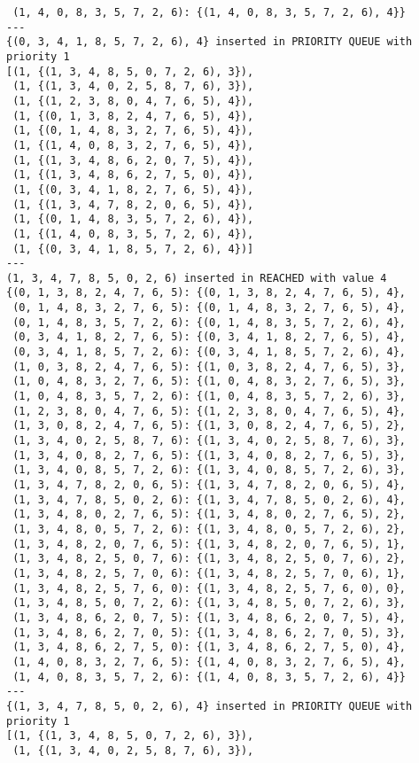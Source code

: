 \documentclass{article}
\begin{document}
\begin{verbatim}
 (1, 4, 0, 8, 3, 5, 7, 2, 6): {(1, 4, 0, 8, 3, 5, 7, 2, 6), 4}}
---
{(0, 3, 4, 1, 8, 5, 7, 2, 6), 4} inserted in PRIORITY QUEUE with priority 1
[(1, {(1, 3, 4, 8, 5, 0, 7, 2, 6), 3}),
 (1, {(1, 3, 4, 0, 2, 5, 8, 7, 6), 3}),
 (1, {(1, 2, 3, 8, 0, 4, 7, 6, 5), 4}),
 (1, {(0, 1, 3, 8, 2, 4, 7, 6, 5), 4}),
 (1, {(0, 1, 4, 8, 3, 2, 7, 6, 5), 4}),
 (1, {(1, 4, 0, 8, 3, 2, 7, 6, 5), 4}),
 (1, {(1, 3, 4, 8, 6, 2, 0, 7, 5), 4}),
 (1, {(1, 3, 4, 8, 6, 2, 7, 5, 0), 4}),
 (1, {(0, 3, 4, 1, 8, 2, 7, 6, 5), 4}),
 (1, {(1, 3, 4, 7, 8, 2, 0, 6, 5), 4}),
 (1, {(0, 1, 4, 8, 3, 5, 7, 2, 6), 4}),
 (1, {(1, 4, 0, 8, 3, 5, 7, 2, 6), 4}),
 (1, {(0, 3, 4, 1, 8, 5, 7, 2, 6), 4})]
---
(1, 3, 4, 7, 8, 5, 0, 2, 6) inserted in REACHED with value 4
{(0, 1, 3, 8, 2, 4, 7, 6, 5): {(0, 1, 3, 8, 2, 4, 7, 6, 5), 4},
 (0, 1, 4, 8, 3, 2, 7, 6, 5): {(0, 1, 4, 8, 3, 2, 7, 6, 5), 4},
 (0, 1, 4, 8, 3, 5, 7, 2, 6): {(0, 1, 4, 8, 3, 5, 7, 2, 6), 4},
 (0, 3, 4, 1, 8, 2, 7, 6, 5): {(0, 3, 4, 1, 8, 2, 7, 6, 5), 4},
 (0, 3, 4, 1, 8, 5, 7, 2, 6): {(0, 3, 4, 1, 8, 5, 7, 2, 6), 4},
 (1, 0, 3, 8, 2, 4, 7, 6, 5): {(1, 0, 3, 8, 2, 4, 7, 6, 5), 3},
 (1, 0, 4, 8, 3, 2, 7, 6, 5): {(1, 0, 4, 8, 3, 2, 7, 6, 5), 3},
 (1, 0, 4, 8, 3, 5, 7, 2, 6): {(1, 0, 4, 8, 3, 5, 7, 2, 6), 3},
 (1, 2, 3, 8, 0, 4, 7, 6, 5): {(1, 2, 3, 8, 0, 4, 7, 6, 5), 4},
 (1, 3, 0, 8, 2, 4, 7, 6, 5): {(1, 3, 0, 8, 2, 4, 7, 6, 5), 2},
 (1, 3, 4, 0, 2, 5, 8, 7, 6): {(1, 3, 4, 0, 2, 5, 8, 7, 6), 3},
 (1, 3, 4, 0, 8, 2, 7, 6, 5): {(1, 3, 4, 0, 8, 2, 7, 6, 5), 3},
 (1, 3, 4, 0, 8, 5, 7, 2, 6): {(1, 3, 4, 0, 8, 5, 7, 2, 6), 3},
 (1, 3, 4, 7, 8, 2, 0, 6, 5): {(1, 3, 4, 7, 8, 2, 0, 6, 5), 4},
 (1, 3, 4, 7, 8, 5, 0, 2, 6): {(1, 3, 4, 7, 8, 5, 0, 2, 6), 4},
 (1, 3, 4, 8, 0, 2, 7, 6, 5): {(1, 3, 4, 8, 0, 2, 7, 6, 5), 2},
 (1, 3, 4, 8, 0, 5, 7, 2, 6): {(1, 3, 4, 8, 0, 5, 7, 2, 6), 2},
 (1, 3, 4, 8, 2, 0, 7, 6, 5): {(1, 3, 4, 8, 2, 0, 7, 6, 5), 1},
 (1, 3, 4, 8, 2, 5, 0, 7, 6): {(1, 3, 4, 8, 2, 5, 0, 7, 6), 2},
 (1, 3, 4, 8, 2, 5, 7, 0, 6): {(1, 3, 4, 8, 2, 5, 7, 0, 6), 1},
 (1, 3, 4, 8, 2, 5, 7, 6, 0): {(1, 3, 4, 8, 2, 5, 7, 6, 0), 0},
 (1, 3, 4, 8, 5, 0, 7, 2, 6): {(1, 3, 4, 8, 5, 0, 7, 2, 6), 3},
 (1, 3, 4, 8, 6, 2, 0, 7, 5): {(1, 3, 4, 8, 6, 2, 0, 7, 5), 4},
 (1, 3, 4, 8, 6, 2, 7, 0, 5): {(1, 3, 4, 8, 6, 2, 7, 0, 5), 3},
 (1, 3, 4, 8, 6, 2, 7, 5, 0): {(1, 3, 4, 8, 6, 2, 7, 5, 0), 4},
 (1, 4, 0, 8, 3, 2, 7, 6, 5): {(1, 4, 0, 8, 3, 2, 7, 6, 5), 4},
 (1, 4, 0, 8, 3, 5, 7, 2, 6): {(1, 4, 0, 8, 3, 5, 7, 2, 6), 4}}
---
{(1, 3, 4, 7, 8, 5, 0, 2, 6), 4} inserted in PRIORITY QUEUE with priority 1
[(1, {(1, 3, 4, 8, 5, 0, 7, 2, 6), 3}),
 (1, {(1, 3, 4, 0, 2, 5, 8, 7, 6), 3}),

\end{verbatim}
\end{document}
